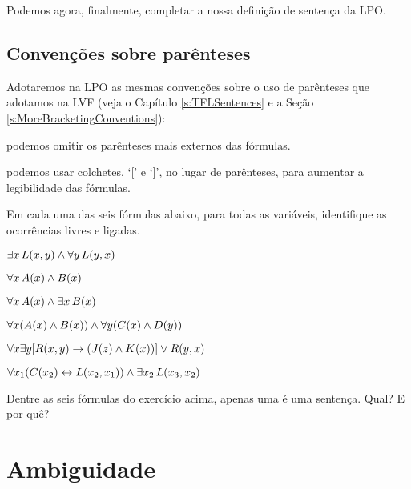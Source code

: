 Podemos agora, finalmente, completar a nossa definição de sentença da LPO.


\section{Convenções sobre parênteses}

Adotaremos na LPO as mesmas convenções sobre o uso de parênteses que adotamos na LVF (veja o Capítulo \ref{s:TFLSentences} e a Seção \ref{s:MoreBracketingConventions}):
\begin{ebullet}
	\item podemos omitir os parênteses mais externos das fórmulas.
	\item podemos usar colchetes, `[' e `]', no lugar de parênteses, para aumentar a legibilidade das fórmulas.
\end{ebullet}



\practiceproblems
\problempart
\label{pr.freeFOL}
Em cada uma das seis fórmulas abaixo, para todas as variáveis, identifique as ocorrências livres e ligadas.
\begin{earg}
\item $\exists x\, \mathord{L}(x,y) \wedge \forall y\, \mathord{L}(y,x)$
\item $\forall x\, \mathord{A}(x) \wedge \mathord{B}(x)$
\item $\forall x\, \mathord{A}(x) \wedge \exists x\, \mathord{B}(x)$
\item $\forall x (\mathord{A}(x) \wedge \mathord{B}(x)) \wedge \forall y(\mathord{C}(x) \wedge \mathord{D}(y))$
\item $\forall x\exists y[\mathord{R}(x,y) \rightarrow (\mathord{J}(z) \wedge \mathord{K}(x))] \vee \mathord{R}(y,x)$
\item $\forall x_1(\mathord{C}(x_2) \leftrightarrow \mathord{L}(x_2,x_1)) \wedge \exists x_2\,\mathord{L}(x_3,x_2)$
\end{earg}

\problempart
Dentre as seis fórmulas do exercício acima, apenas uma é uma sentença.
Qual? E por quê?

\chapter{Ambiguidade}\label{s:ambiguityFOL}


